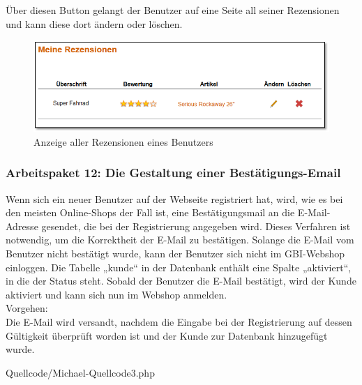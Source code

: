 Über diesen Button gelangt der Benutzer auf eine Seite all seiner Rezensionen und kann diese dort ändern oder löschen.

\begin{figure}[H]
\begin{center}
\includegraphics[width=12cm]{Bilder/Michael_Abbildung14-AnzeigeAllerRezensionenEinesBenutzers.png}
\end{center}
\caption{Anzeige aller Rezensionen eines Benutzers}
\end{figure}

\newpage

\subsubsection{Arbeitspaket 12: Die Gestaltung einer Bestätigungs-Email}

Wenn sich ein neuer Benutzer auf der Webseite registriert hat, wird, wie es bei den meisten Online-Shops der Fall ist, eine Bestätigungsmail an die E-Mail-Adresse gesendet, die bei der Registrierung angegeben wird. Dieses Verfahren ist notwendig, um die Korrektheit der E-Mail zu bestätigen. 
Solange die E-Mail vom Benutzer nicht bestätigt wurde, kann der Benutzer sich nicht im GBI-Webshop einloggen. Die Tabelle „kunde“ in der Datenbank enthält eine Spalte „aktiviert“, in die der Status steht. Sobald der Benutzer die E-Mail bestätigt, wird der Kunde aktiviert und kann sich nun im Webshop anmelden.
\\
Vorgehen:
\\
Die E-Mail wird versandt, nachdem die Eingabe bei der Registrierung auf dessen Gültigkeit überprüft worden ist und der Kunde zur Datenbank hinzugefügt wurde. 


\begin{center}
	\begin{lstinputlisting}[language=PHP, caption={Aktivierungs-E-Mail versenden}]
		{Quellcode/Michael-Quellcode3.php}
	\end{lstinputlisting}
\end{center}

